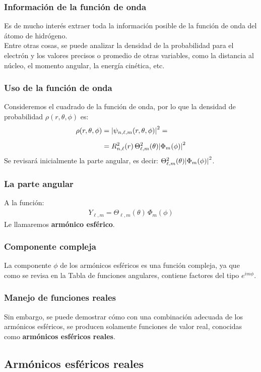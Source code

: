 \documentclass[12pt]{beamer}
\begin{document}
\begin{frame}
\frametitle{Información de la función de onda}
Es de mucho interés extraer toda la información posible de la función de onda del átomo de hidrógeno.
\\
\bigskip
\pause
Entre otras cosas, se puede analizar la \textcolor{burgundy}{densidad de la probabilidad} para el electrón y los valores precisos o promedio de otras variables, como la \textcolor{byzantium}{distancia al núcleo}, el \textcolor{candyapplered}{momento angular}, la \textcolor{chestnut}{energía cinética}, etc.
\end{frame}
\begin{frame}
\frametitle{Uso de la función de onda}
Consideremos el cuadrado de la función de onda, por lo que la densidad de probabilidad $\rho (r, \theta, \phi)$ es:
\pause
\begin{eqnarray}
\begin{aligned}[b]
\rho (r, \theta, \phi) &= \abs{\psi_{n, \ell, m} (r, \theta, \phi)}^{2} = \\[0.5em]
&= R_{n,\ell}^{2} (r) \, \Theta_{\ell,m}^{2} (\theta) \abs{\Phi_{m} (\phi)}^{2}
\end{aligned}
\label{eq:ecuacion_07_42}
\end{eqnarray}
Se revisará inicialmente la parte angular, es decir: $\Theta_{\ell,m}^{2} (\theta) \abs{\Phi_{m} (\phi)}^{2}$.
\end{frame}
\begin{frame}
\frametitle{La parte angular}
A la función:
\pause
\begin{align}
Y_{\ell, m} = \Theta_{\ell,m} (\theta) \,\Phi_{m} (\phi)
\label{eq:ecuacion_07_76}
\end{align}
Le llamaremos \textbf{\textcolor{cinnabar}{armónico esférico}}.
\end{frame}
\begin{frame}
\frametitle{Componente compleja}
La componente $\phi$ de los armónicos esféricos es una función compleja, \pause ya que como se revisa en la Tabla de funciones angulares, contiene factores del tipo $e^{i m \phi}$. 
\end{frame}
\begin{frame}
\frametitle{Manejo de funciones reales}
Sin embargo, se puede demostrar cómo con una combinación adecuada de los armónicos esféricos, se producen solamente funciones de valor real, conocidas como \textbf{\textcolor{coolblack}{armónicos esféricos reales}}.
\end{frame}

\subsection{Armónicos esféricos reales}
\end{document}
